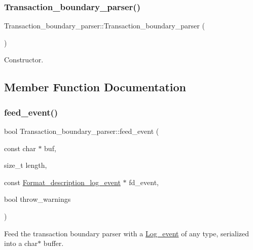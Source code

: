 \subsubsection{\texorpdfstring{Transaction\+\_\+boundary\+\_\+parser()}{Transaction\_boundary\_parser()}}
{\footnotesize\ttfamily Transaction\+\_\+boundary\+\_\+parser\+::\+Transaction\+\_\+boundary\+\_\+parser (\begin{DoxyParamCaption}{ }\end{DoxyParamCaption})\hspace{0.3cm}{\ttfamily [inline]}}

Constructor. 

\subsection{Member Function Documentation}
\mbox{\label{classTransaction__boundary__parser_a1197dba976b325a64bbcde19cc235b40}} 
\subsubsection{\texorpdfstring{feed\+\_\+event()}{feed\_event()}}
{\footnotesize\ttfamily bool Transaction\+\_\+boundary\+\_\+parser\+::feed\+\_\+event (\begin{DoxyParamCaption}\item[{const char $\ast$}]{buf,  }\item[{size\+\_\+t}]{length,  }\item[{const \mbox{\hyperlink{classFormat__description__log__event}{Format\+\_\+description\+\_\+log\+\_\+event}} $\ast$}]{fd\+\_\+event,  }\item[{bool}]{throw\+\_\+warnings }\end{DoxyParamCaption})}

Feed the transaction boundary parser with a \mbox{\hyperlink{classLog__event}{Log\+\_\+event}} of any type, serialized into a char$\ast$ buffer.


